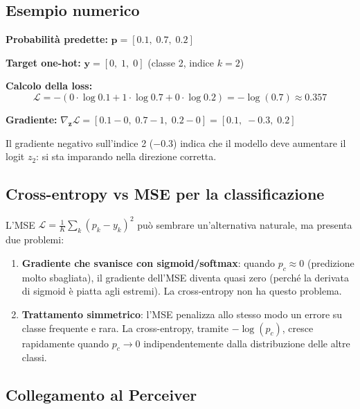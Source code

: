 \documentclass[
  11pt,
]{article}
\begin{document}
\subsection{Esempio numerico}

\begin{notabox}[title={\textbf{Esempio: classificazione a 3 classi, classe vera = 2}}]
\textbf{Probabilità predette:} $\mathbf{p} = [0.1,\; 0.7,\; 0.2]$

\textbf{Target one-hot:} $\mathbf{y} = [0,\; 1,\; 0]$ (classe 2, indice $k=2$)

\textbf{Calcolo della loss:}
\[
\mathcal{L} = -(0 \cdot \log 0.1 + 1 \cdot \log 0.7 + 0 \cdot \log 0.2) = -\log(0.7) \approx 0.357
\]

\textbf{Gradiente:} $\nabla_{\mathbf{z}} \mathcal{L} = [0.1 - 0,\; 0.7 - 1,\; 0.2 - 0] = [0.1,\; -0.3,\; 0.2]$

Il gradiente negativo sull'indice 2 ($-0.3$) indica che il modello deve aumentare il logit $z_2$: si sta imparando nella direzione corretta.
\end{notabox}

\subsection{Cross-entropy vs MSE per la classificazione}

\begin{notabox}[title={\textbf{Perché non usare l'MSE per la classificazione?}}]
L'MSE $\mathcal{L} = \frac{1}{K}\sum_k (p_k - y_k)^2$ può sembrare un'alternativa naturale, ma presenta due problemi:
\begin{enumerate}
  \item \textbf{Gradiente che svanisce con sigmoid/softmax}: quando $p_c \approx 0$ (predizione molto sbagliata), il gradiente dell'MSE diventa quasi zero (perché la derivata di sigmoid è piatta agli estremi). La cross-entropy non ha questo problema.
  \item \textbf{Trattamento simmetrico}: l'MSE penalizza allo stesso modo un errore su classe frequente e rara. La cross-entropy, tramite $-\log(p_c)$, cresce rapidamente quando $p_c \to 0$ indipendentemente dalla distribuzione delle altre classi.
\end{enumerate}
\end{notabox}

\subsection{Collegamento al Perceiver}
\end{document}
